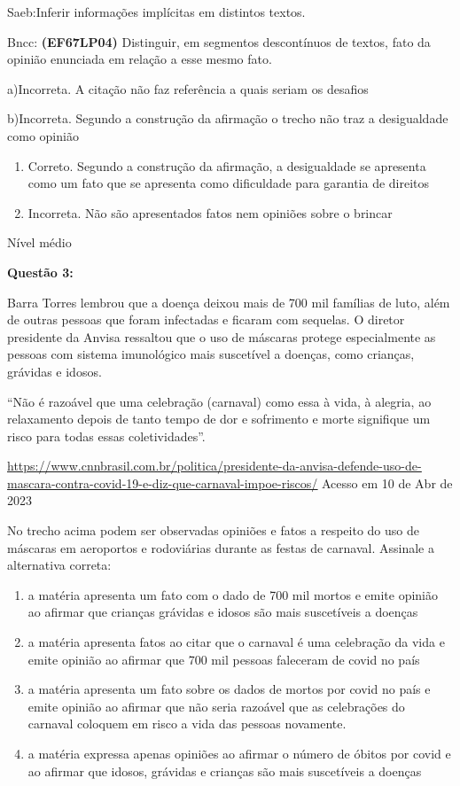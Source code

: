 {Saeb:Inferir informações implícitas em distintos textos.

Bncc: \textbf{(EF67LP04)} Distinguir, em segmentos descontínuos de
textos, fato da opinião enunciada em relação a esse mesmo fato.

a)Incorreta. A citação não faz referência a quais seriam os desafios

b)Incorreta. Segundo a construção da afirmação o trecho não traz a
desigualdade como opinião

\begin{enumerate}
\def\labelenumi{\arabic{enumi}.}
\item
  Correto. Segundo a construção da afirmação, a desigualdade se
  apresenta como um fato que se apresenta como dificuldade para garantia
  de direitos
\item
  Incorreta. Não são apresentados fatos nem opiniões sobre o brincar
\end{enumerate}

Nível médio

\textbf{Questão 3:}

Barra Torres lembrou que a doença deixou mais de 700 mil famílias de
luto, além de outras pessoas que foram infectadas e ficaram com
sequelas. O diretor presidente da Anvisa ressaltou que o uso de máscaras
protege especialmente as pessoas com sistema imunológico mais suscetível
a doenças, como crianças, grávidas e idosos.

``Não é razoável que uma celebração (carnaval) como essa à vida, à
alegria, ao relaxamento depois de tanto tempo de dor e sofrimento e
morte signifique um risco para todas essas coletividades''.

\href{https://www.cnnbrasil.com.br/politica/presidente-da-anvisa-defende-uso-de-mascara-contra-covid-19-e-diz-que-carnaval-impoe-riscos/}{\uline{https://www.cnnbrasil.com.br/politica/presidente-da-anvisa-defende-uso-de-mascara-contra-covid-19-e-diz-que-carnaval-impoe-riscos/}}
Acesso em 10 de Abr de 2023

No trecho acima podem ser observadas opiniões e fatos a respeito do uso
de máscaras em aeroportos e rodoviárias durante as festas de carnaval.
Assinale a alternativa correta:

\begin{enumerate}
\def\labelenumi{\alph{enumi})}
\item
  a matéria apresenta um fato com o dado de 700 mil mortos e emite
  opinião ao afirmar que crianças grávidas e idosos são mais suscetíveis
  a doenças
\item
  a matéria apresenta fatos ao citar que o carnaval é uma celebração da
  vida e emite opinião ao afirmar que 700 mil pessoas faleceram de covid
  no país
\item
  a matéria apresenta um fato sobre os dados de mortos por covid no país
  e emite opinião ao afirmar que não seria razoável que as celebrações
  do carnaval coloquem em risco a vida das pessoas novamente.
\item
  a matéria expressa apenas opiniões ao afirmar o número de óbitos por
  covid e ao afirmar que idosos, grávidas e crianças são mais
  suscetíveis a doenças
\end{enumerate}

}
